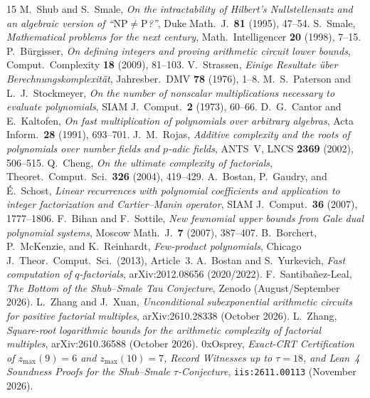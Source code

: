 \documentclass[11pt]{article}
\newcommand{\code}[1]{\texttt{#1}}
\newcommand{\zmax}{z_{\max}}
\begin{document}
\begin{thebibliography}{15}
 M.~Shub and S.~Smale, \emph{On the intractability of Hilbert's Nullstellensatz and an algebraic version of ``$\mathrm{NP} \neq \mathrm{P}$?''}, Duke Math.\ J.\ \textbf{81} (1995), 47--54.
 S.~Smale, \emph{Mathematical problems for the next century}, Math.\ Intelligencer \textbf{20} (1998), 7--15.
 P.~B\"urgisser, \emph{On defining integers and proving arithmetic circuit lower bounds}, Comput.\ Complexity \textbf{18} (2009), 81--103.
 V.~Strassen, \emph{Einige Resultate \"uber Berechnungskomplexit\"at}, Jahresber.\ DMV \textbf{78} (1976), 1--8.
 M.~S.~Paterson and L.~J.~Stockmeyer, \emph{On the number of nonscalar multiplications necessary to evaluate polynomials}, SIAM J.\ Comput.\ \textbf{2} (1973), 60--66.
 D.~G.~Cantor and E.~Kaltofen, \emph{On fast multiplication of polynomials over arbitrary algebras}, Acta Inform.\ \textbf{28} (1991), 693--701.
 J.~M.~Rojas, \emph{Additive complexity and the roots of polynomials over number fields and $p$-adic fields}, ANTS~V, LNCS \textbf{2369} (2002), 506--515.
 Q.~Cheng, \emph{On the ultimate complexity of factorials}, Theoret.\ Comput.\ Sci.\ \textbf{326} (2004), 419--429.
 A.~Bostan, P.~Gaudry, and \'E.~Schost, \emph{Linear recurrences with polynomial coefficients and application to integer factorization and Cartier--Manin operator}, SIAM J.\ Comput.\ \textbf{36} (2007), 1777--1806.
 F.~Bihan and F.~Sottile, \emph{New fewnomial upper bounds from Gale dual polynomial systems}, Moscow Math.\ J.\ \textbf{7} (2007), 387--407.
 B.~Borchert, P.~McKenzie, and K.~Reinhardt, \emph{Few-product polynomials}, Chicago J.\ Theor.\ Comput.\ Sci.\ (2013), Article~3.
 A.~Bostan and S.~Yurkevich, \emph{Fast computation of $q$-factorials}, arXiv:2012.08656 (2020/2022).
 F.~Santiba\~{n}ez-Leal, \emph{The Bottom of the Shub--Smale Tau Conjecture}, Zenodo (August/September 2026).
 L.~Zhang and J.~Xuan, \emph{Unconditional subexponential arithmetic circuits for positive factorial multiples}, arXiv:2610.28338 (October 2026).
 L.~Zhang, \emph{Square-root logarithmic bounds for the arithmetic complexity of factorial multiples}, arXiv:2610.36588 (October 2026).
 0xOsprey, \emph{Exact-CRT Certification of $\zmax(9) = 6$ and $\zmax(10) = 7$, Record Witnesses up to $\tau = 18$, and Lean~4 Soundness Proofs for the Shub--Smale $\tau$-Conjecture}, \code{iis:2611.00113} (November 2026).
\end{thebibliography}
\end{document}
